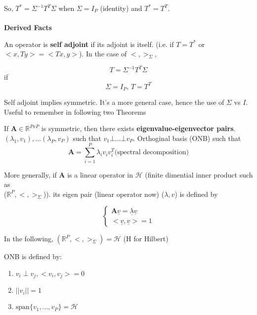 \documentclass[11pt,fleqn]{book} %
\begin{document}
So, $T^* = \Sigma^{-1} T^T \Sigma$ when $\Sigma = I_P$ (identity) 
and $T^* = T^T$. \\
\\
\textbf{Derived Facts}

An operator is \textbf{self adjoint} if its adjoint is itself. (i.e. if $T = T^*$ or $<x, Ty> = <Tx, y>$). In the case of $<,>_\Sigma$, 

$$T = \Sigma^{-1} T^T \Sigma$$
 if 
$$ \Sigma = I_P\text{, }T = T^T$$ 

\begin{remark}
	Self adjoint implies symmetric. It's a more general case, hence the use of $\Sigma$ vs $I$. Useful to remember in following two Theorems
\end{remark}

\begin{theorem}
	If $\bm{A} \in \mathbb{R}^{PxP}$ is symmetric, then there exists \textbf{eigenvalue-eigenvector pairs}.\\
	 $(\lambda_1, v_1), \dots (\lambda_P, v_P)$ such that $v_1 \bot \dots \bot v_P$. Orthoginal basis (ONB) such that $$\bm{A} = \displaystyle \sum^P_{i=1} \lambda_i v_i v_i^T \text{(spectral decomposition)}$$ 
\end{theorem}
 
 More generally, if $\bm{A}$ is a linear operator in $\mathscr{H}$ (finite dimential inner product such as \\ ($\mathbb{R}^P, <,>_\Sigma$)). its eigen pair (linear operator now) ($\lambda, v$) is defined by 

$$\begin{cases}
 \bm{A}\underline{v} = \underline{\lambda} \underline{v}\\
 <\underline{v},\underline{v}> = 1
 \end{cases}$$

\begin{definition}
In the following, $(\mathbb{R}^P, <,>_\Sigma) = \mathscr{H}$ (H for Hilbert)

ONB is defined by:	

	\begin{enumerate}
		\item $v_i \perp v_j, <v_i, v_j> = 0$ 
		\item $||v_i || = 1$
		\item $\text{span}\{v_1, \dots, v_P \} = \mathscr{H}$
	\end{enumerate}
\end{definition}
\end{document}

